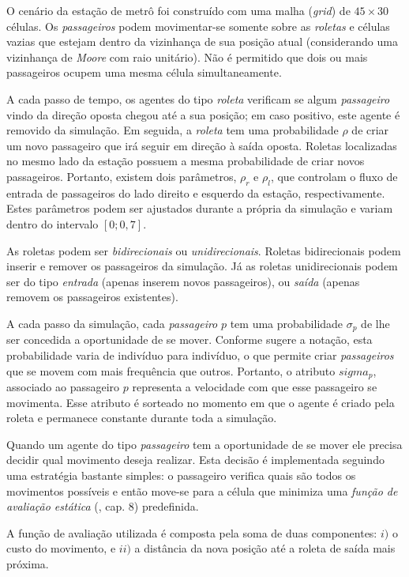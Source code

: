 \documentclass[preprint,12pt]{elsarticle}
\begin{document}
O cenário da estação de metrô foi construído com uma malha (\textit{grid}) de $45 \times 30$ células. Os \textit{passageiros} podem movimentar-se somente sobre as \textit{roletas} e células vazias que estejam dentro da vizinhança de sua posição atual (considerando uma vizinhança de \textit{Moore} com raio unitário). Não é permitido que dois ou mais passageiros ocupem uma mesma célula simultaneamente. 

A cada passo de tempo, os agentes do tipo \textit{roleta} verificam se algum \textit{passageiro} vindo da direção oposta chegou até a sua posição; em caso positivo, este agente é removido da simulação. Em seguida, a \textit{roleta} tem uma probabilidade $\rho$ de criar um novo passageiro que irá seguir em direção à saída oposta. Roletas localizadas no mesmo lado da estação possuem a mesma probabilidade de criar novos passageiros. Portanto, existem dois parâmetros, $\rho_r$ e $\rho_l$, que controlam o fluxo de entrada de passageiros do lado direito e esquerdo da estação, respectivamente. Estes parâmetros podem ser ajustados durante a própria da simulação e variam dentro do intervalo $[0; 0,7]$.

As roletas podem ser \textit{bidirecionais} ou \textit{unidirecionais}. Roletas bidirecionais podem inserir e remover os passageiros da simulação. Já as roletas unidirecionais podem ser do tipo \textit{entrada} (apenas inserem novos passageiros), ou \textit{saída} (apenas removem os passageiros existentes). 

A cada passo da simulação, cada \textit{passageiro} $p$ tem uma probabilidade $\sigma_p$ de lhe ser concedida a oportunidade de se mover. Conforme sugere a notação, esta probabilidade varia de indivíduo para indivíduo, o que permite criar \textit{passageiros} que se movem com mais frequência que outros. Portanto, o atributo $sigma_p$, associado ao passageiro $p$ representa a velocidade com que esse passageiro se movimenta. Esse atributo é sorteado no momento em que o agente é criado pela roleta e permanece constante durante toda a simulação.

Quando um agente do tipo \textit{passageiro} tem a oportunidade de se mover ele precisa decidir qual movimento deseja realizar. Esta decisão é implementada seguindo uma estratégia bastante simples: o passageiro verifica quais são todos os movimentos possíveis e então move-se para a célula que minimiza uma \textit{função de avaliação estática} (\cite{millington2016artificial}, cap. 8) predefinida.

A função de avaliação utilizada é composta pela soma de duas componentes: $i)$ o custo do movimento, e $ii)$ a distância da nova posição até a roleta de saída mais próxima.
\end{document}
